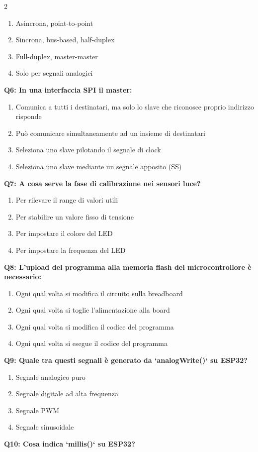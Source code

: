 \documentclass[10pt]{article}
\begin{document}
\begin{multicols}{2}
\begin{enumerate}[label=\arabic*.]
\item Asincrona, point-to-point
\item Sincrona, bus-based, half-duplex
\item Full-duplex, master-master
\item Solo per segnali analogici
\end{enumerate}
\textbf{Q6: In una interfaccia SPI il master:}

\begin{enumerate}[label=\arabic*.]
\item Comunica a tutti i destinatari, ma solo lo slave che riconosce proprio indirizzo risponde
\item Può comunicare simultaneamente ad un insieme di destinatari
\item Seleziona uno slave pilotando il segnale di clock
\item Seleziona uno slave mediante un segnale apposito (SS)
\end{enumerate}
\textbf{Q7: A cosa serve la fase di calibrazione nei sensori luce?}

\begin{enumerate}[label=\arabic*.]
\item Per rilevare il range di valori utili
\item Per stabilire un valore fisso di tensione
\item Per impostare il colore del LED
\item Per impostare la frequenza del LED
\end{enumerate}
\textbf{Q8: L'upload del programma alla memoria flash del microcontrollore è necessario:}

\begin{enumerate}[label=\arabic*.]
\item Ogni qual volta si modifica il circuito sulla breadboard
\item Ogni qual volta si toglie l'alimentazione alla board
\item Ogni qual volta si modifica il codice del programma
\item Ogni qual volta si esegue il codice del programma
\end{enumerate}
\textbf{Q9: Quale tra questi segnali è generato da `analogWrite()` su ESP32?}

\begin{enumerate}[label=\arabic*.]
\item Segnale analogico puro
\item Segnale digitale ad alta frequenza
\item Segnale PWM
\item Segnale sinusoidale
\end{enumerate}
\textbf{Q10: Cosa indica `millis()` su ESP32?}


\end{multicols}
\end{document}
